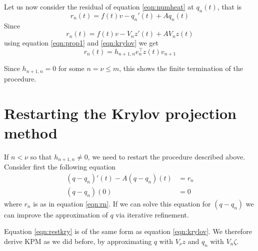 Let us now consider the residual of equation \eqref{eqn:numheat} at $q_n(t)$, that is
\begin{equation*}
r_n(t) = f(t) v - q_n'(t) +Aq_n(t)
\end{equation*}
Since
\begin{equation*}
r_n(t) = f(t)v -V_n z'(t) + A V_n z(t)
\end{equation*}
using equation \eqref{eqn:prop1} and \eqref{eqn:krylov} we get
\begin{equation} \label{eqn:rn}
r_n(t) = h_{n+1,n}e_n^\top z(t) v_{n+1}
\end{equation}

Since $h_{n+1,n} = 0$ for some $n = \nu \leq m$, this shows the finite termination of the procedure.


\section{Restarting the Krylov projection method} \label{sec:rest}
If $n < \nu$ so that $h_{n+1,n} \neq 0$, we need to restart the procedure described above. Consider first the following equation
\begin{equation}\label{eqn:restkry}
\begin{aligned}
 (q-q_n)'(t) -A (q-q_n)(t) &= r_n \\
(q-q_n)(0)& = 0
\end{aligned}
\end{equation}
where $r_n$ is as in equation \eqref{eqn:rn}. If we can solve this equation for $(q-q_n)$ we can improve the approximation of $q$ via iterative refinement.

Equation \eqref{eqn:restkry} is of the same form as equation \eqref{eqn:krylov}. We therefore derive KPM as we did before, by approximating $q$ with $V_\nu z$ and $q_n$ with $V_n \zeta $.

